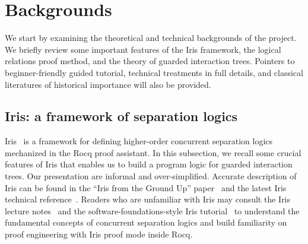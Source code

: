 \documentclass{article}
\theoremstyle{definition}
\theoremstyle{plain}
\theoremstyle{remark}
\begin{document}
\section{Backgrounds}

We start by examining the theoretical and technical backgrounds of the project.
We briefly review some important features of the Iris framework, the logical relations proof method, and the theory of guarded interaction trees.
Pointers to beginner-friendly guided tutorial, technical treatments in full details, and classical literatures of historical importance will also be provided.

\subsection{Iris: a framework of separation logics}

Iris~\cite{iris3} is a framework for defining higher-order concurrent separation logics mechanized in the Rocq proof assistant.
In this subsection, we recall some crucial features of Iris that enables us to build a program logic for guarded interaction trees.
Our presentation are informal and over-simplified. Accurate description of Iris can be found in the ``Iris from the Ground Up'' paper~\cite{iris3} and the latest Iris technical reference~\cite{iris-appendix}.
Readers who are unfamiliar with Iris may consult the Iris lecture notes~\cite{iris-lecture-notes} and the software-foundations-style Iris tutorial~\cite{iris-tutorial} to understand the fundamental concepts of concurrent separation logics and build familiarity on proof engineering with Iris proof mode inside Rocq.
\end{document}
